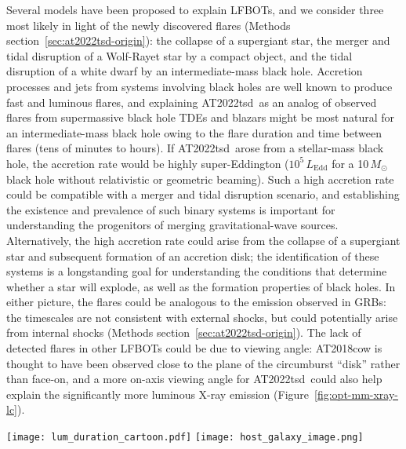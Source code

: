 \documentclass{nature_plusfigure}
\newcommand{\at}{AT2022tsd}
\begin{document}
Several models have been proposed to explain LFBOTs\cite{Metzger2022}, and we consider three most likely in light of the newly discovered flares (Methods section~\ref{sec:at2022tsd-origin}): the collapse of a supergiant star\cite{Perley2019,Margutti2019,Quataert2019}, the merger and tidal disruption of a Wolf-Rayet star by a compact object\cite{Metzger2022}, and the tidal disruption of a white dwarf by an intermediate-mass black hole\cite{Kuin2019,Perley2019}.
Accretion processes and jets from systems involving black holes are well known to produce fast and luminous flares,
and explaining \at\ as an analog of observed flares from supermassive black hole TDEs and blazars might be most natural for an intermediate-mass black hole owing to the flare duration and time between flares (tens of minutes to hours).
If \at\ arose from a stellar-mass black hole, the accretion rate would be highly super-Eddington ($10^{5}\,L_\mathrm{Edd}$ for a 10\,$M_\odot$ black hole without relativistic or geometric beaming). Such a high accretion rate could be compatible with a merger and tidal disruption scenario\cite{Metzger2022}, and establishing the existence and prevalence of such binary systems is important for understanding the progenitors of merging gravitational-wave sources.
Alternatively, the high accretion rate could arise from the collapse of a supergiant star\cite{Quataert2019} and subsequent formation of an accretion disk; the identification of these systems is a longstanding goal for understanding the conditions that determine whether a star will explode, as well as the formation properties of black holes.
In either picture, the flares could be analogous to the emission observed in GRBs: the timescales are not consistent with external shocks, but could potentially arise from internal shocks (Methods section~\ref{sec:at2022tsd-origin}).
The lack of detected flares in other LFBOTs could be due to viewing angle: AT2018cow is thought to have been observed close to the plane of the circumburst ``disk'' rather than face-on\cite{Margutti2019,Chen2023}, and a more on-axis viewing angle for \at\ could also help explain the significantly more luminous X-ray emission (Figure~\ref{fig:opt-mm-xray-lc}).

\newpage

\begin{figure*}
\centering
    \texttt{[image: lum\_duration\_cartoon.pdf]}
    \texttt{[image: host\_galaxy\_image.png]}
\caption{\textbf{\at\ is a luminous fast blue optical transient (LFBOT) showing flares with unprecedented timescales.}
\emph{Top:} Duration above half-maximum light ($t_{1/2}$) vs. peak absolute magnitude $M$ (or peak luminosity $\nu L_\nu$) of \at, its flares, and other extragalactic optical transients.  
\emph{Bottom:} Keck/LRIS false-color $u/g/I$ image centered at the position of \at, which is marked.
See Methods section~\ref{sec:data-transient-parameter-space} for additional details and data sources.
}
 \label{fig:transient-parameter-space}
\end{figure*}
\end{document}
